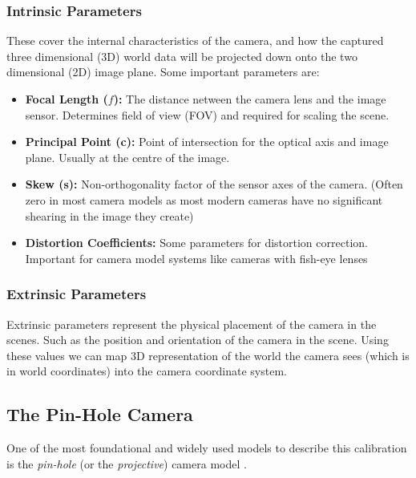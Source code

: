 \subsubsection{Intrinsic Parameters}
\label{subsubsec:intrinsic}

These cover the internal characteristics of the camera, and how the captured three dimensional (3D) world data will be projected down onto the two dimensional (2D) image plane.
Some important parameters are:

\begin{itemize}
  \item \textbf{Focal Length ($f$):} The distance netween the camera lens and the image sensor. Determines field of view (FOV) and required for scaling the scene.
  \item \textbf{Principal Point (c):} Point of intersection for the optical axis and image plane. Usually at the centre of the image.
  \item \textbf{Skew (s):} Non-orthogonality factor of the sensor axes of the camera. (Often zero in most camera models as most modern cameras have no significant shearing in the image they create)
  \item \textbf{Distortion Coefficients:} Some parameters for distortion correction. Important for camera model systems like cameras with fish-eye lenses \cite{king1989history}
\end{itemize}


\subsubsection{Extrinsic Parameters}
Extrinsic parameters represent the physical placement of the camera in the scenes. Such as the position and orientation of the camera in the scene. Using these values we can map  3D representation of the world the camera sees (which is in world coordinates) into the camera coordinate system.
\\

\subsection {The Pin-Hole Camera}
One of the most foundational and widely used models to describe this calibration is the \emph{pin-hole} (or the  \emph{projective}) camera model \cite{solem2012programming}. 

